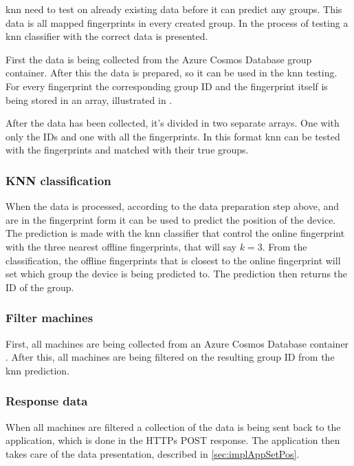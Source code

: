\Acrshort{knn} need to test on already existing data before it can predict any groups. 
This data is all mapped fingerprints in every created group.
In  the process of testing a \acrshort{knn} classifier with the correct data is presented.

\bigskip

First the data is being collected from the Azure Cosmos Database \cite{IntroductionAzureCosmos} group container. 
After this the data is prepared, so it can be used in the \acrshort{knn} testing.
For every fingerprint the corresponding group ID and the fingerprint itself is being stored in an array, illustrated in .


After the data has been collected, it's divided in two separate arrays.
One with only the IDs and one with all the fingerprints.
In this format \acrshort{knn} can be tested with the fingerprints and matched with their true groups.


\subsubsection{KNN classification}\label{sec:implServerSetPosKnnClassification}
When the data is processed, according to the data preparation step above, and are in the fingerprint form it can be used to predict the position of the device.
The prediction is made with the \acrshort{knn} classifier that control the online fingerprint with the three nearest offline fingerprints, that will say $k=3$.
From the classification, the offline fingerprints that is closest to the online fingerprint will set which group the device is being predicted to.
The prediction then returns the ID of the group.

\subsubsection{Filter machines}\label{sec:implServerSetPosFilterMachines}
First, all machines are being collected from an Azure Cosmos Database container \cite{IntroductionAzureCosmos}.
After this, all machines are being filtered on the resulting group ID from the \acrshort{knn} prediction.

\subsubsection{Response data}\label{sec:implServerSetPosResponse}
When all machines are filtered a collection of the data is being sent back to the application, which is  done in the HTTPs POST response.
The application then takes care of the data presentation, described in \cref{sec:implAppSetPos}.

